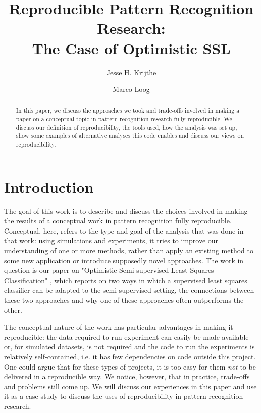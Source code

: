 \documentclass[runningheads,a4paper]{llncs}\usepackage[]{graphicx}\usepackage[]{color}
\begin{document}
\title{Reproducible Pattern Recognition Research:\\The Case of Optimistic SSL}

\author{Jesse H. Krijthe \and Marco Loog}


			
\maketitle

\begin{abstract}
In this paper, we discuss the approaches we took and trade-offs involved in making a paper on a conceptual topic in pattern recognition research fully reproducible. We discuss our definition of reproducibility, the tools used, how the analysis was set up, show some examples of alternative analyses this code enables and discuss our views on reproducibility.
\end{abstract}


\section{Introduction}
The goal of this work is to describe and discuss the choices involved in making the results of a conceptual work in pattern recognition fully reproducible. Conceptual, here, refers to the type and goal of the analysis that was done in that work: using simulations and experiments, it tries to improve our understanding of one or more methods, rather than apply an existing method to some new application or introduce supposedly novel approaches. The work in question is our paper on "Optimistic Semi-supervised Least Squares Classification" \cite{Krijthe2016a}, which reports on two ways in which a supervised least squares classifier can be adapted to the semi-supervised setting, the connections between these two approaches and why one of these approaches often outperforms the other.

The conceptual nature of the work has particular advantages in making it reproducible: the data required to run experiment can easily be made available or, for simulated datasets, is not required and the code to run the experiments is relatively self-contained, i.e. it has few dependencies on code outside this project. One could argue that for these types of projects, it is too easy for them \emph{not} to be delivered in a reproducible way. We notice, however, that in practice, trade-offs and problems still come up. We will discuss our experiences in this paper and use it as a case study to discuss the uses of reproducibility in pattern recognition research.
\end{document}

